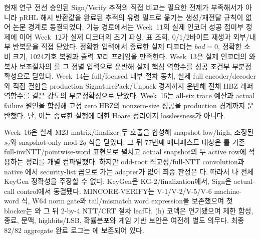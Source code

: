 \begin{takeaway}{현재 연구 전선}
승인된 Sign/Verify 추적의  직접 비교는 필요한 전제가
부족해서가 아니라 pRHL 해시 반환값을 완료된 추적의 유령 필드로 옮기는
생성/재전달 규칙이 없어 논문 경계로 동결되었다. 기능 경로에서는 Week~11의
실제 인코더 성공 접미부 정제에 이어 Week~12가 실제 디코더의 초기 파싱, 표
조회, 0/1/2바이트 재생과 외부/내부 반복문을 직접 닫았다. 정확한
 입력에서 종료한 실제 디코더는 \(bad=0\), 정확한 소비
크기, 1024기호 복원과 출력 꼬리 프레임을 만족한다. Week~13은 실제 인코더의
와 복사 보조절차의 를 그
점별 입력으로 운반해 실제 핵심 역함수를 성공 조건부 부분정확성으로 닫았다.
Week~14는 full/focused 내부 절차 동치, 실제 full encoder/decoder와 직접 결합을
production SignaturePack/Unpack 경계까지 운반해 전체 HBZ 래퍼 역함수를 같은
강도의 부분정확성으로 닫았다. Week~15는 all-six trace 예산과 actual failure
원인을 합성해 고정 zero HBZ의 nonzero-size 성공을 production 경계까지
운반했다. 단, 이는 종료한 실행에 대한 Hoare 정리이지 losslessness가 아니다.

Week~16은 실제 M23 matrix/finalizer 두 호출을 합성해 snapshot low/high,
조정된 \(s_2\)와 snapshot-only mod-\(2q\) 식을 닫았다. 그 뒤 77번째
매니페스트 대상은 를 기존 full-invNTT/pointwise-word
표현으로 펼치고 actual snapshot의 두 active row에 적용하는 정리를 개별
컴파일했다. 하지만 odd-root 직교성/full-NTT convolution과 native
에서 security-list 곱으로 가는 adapter가 없어 최종 판정은
다. 따라서 나 전체 KeyGen 정확성을
주장할 수 없다. KeyGen은 KG-2/finalization에서, Sign은 actual-call control에서
동결됐다. MINCORE-VERIFY는 V-1/V-2/V-5/V-6 machine-word 식, W64 norm gate와
tail/mismatch word expression을 보존했으며 첫 blocker는
와 그 뒤 2-by-4 NTT/CRT 절차 leaf다. (h) 코덱은
연기됐으며 제한 합성, 종료, 문맥, highbits/LSB, 확률분포와 게임 기반 보안은
여전히 별도 의무다. 최종 82/82 aggregate 완료 로그는
에 보존되어 있다.
\end{takeaway}
